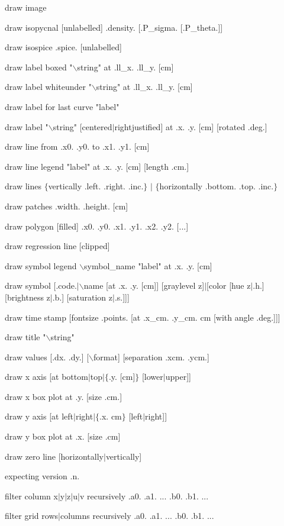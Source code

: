 draw image

draw isopycnal [unlabelled] .density. [.P\_sigma. [.P\_theta.]]

draw isospice .spice. [unlabelled]

draw label boxed "$\backslash$string" at .ll\_x. .ll\_y. [cm]

draw label whiteunder "$\backslash$string" at .ll\_x. .ll\_y. [cm]

draw label for last curve "label"

draw label "$\backslash$string" [centered$\mid$rightjustified] at .x. .y. [cm] [rotated .deg.]

draw line from .x0. .y0. to .x1. .y1. [cm]

draw line legend "label" at .x. .y. [cm] [length .cm.]

draw lines $\lbrace$vertically .left. .right. .inc.$\rbrace$ $\mid$ $\lbrace$horizontally .bottom. .top. .inc.$\rbrace$

draw patches .width. .height. [cm]

draw polygon [filled] .x0. .y0. .x1. .y1. .x2. .y2. [...]

draw regression line [clipped]

draw symbol legend $\backslash$symbol\_name "label" at .x. .y. [cm]

draw symbol [.code.$\mid$$\backslash$name [at .x. .y. [cm]] [graylevel z]$\mid$[color [hue z$\mid$.h.] [brightness z$\mid$.b.] [saturation z$\mid$.s.]]]

draw time stamp [fontsize .points. [at .x\_cm. .y\_cm. cm [with angle .deg.]]]

draw title "$\backslash$string"

draw values [.dx. .dy.] [$\backslash$format] [separation .xcm. .ycm.]

draw x axis [at bottom$\mid$top$\mid$$\lbrace$.y. [cm]$\rbrace$ [lower$\mid$upper]]

draw x box plot at .y. [size .cm.]

draw y axis [at left$\mid$right$\mid$$\lbrace$.x. cm$\rbrace$ [left$\mid$right]]

draw y box plot at .x. [size .cm]

draw zero line [horizontally$\mid$vertically]

expecting version .n.

filter column x$\mid$y$\mid$z$\mid$u$\mid$v recursively .a0. .a1. ... .b0. .b1. ...

filter grid rows$\mid$columns recursively .a0. .a1. ... .b0. .b1. ...

